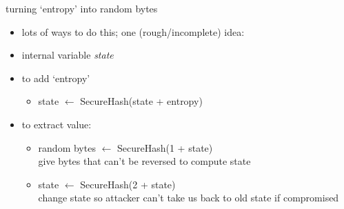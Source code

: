 \begin{frame}{turning `entropy' into random bytes}
    \begin{itemize}
    \item lots of ways to do this; one (rough/incomplete) idea:
    \item internal variable \textit{state}
    \item to add `entropy'
        \begin{itemize}
        \item state $\leftarrow$ SecureHash(state + entropy)
        \end{itemize}
    \item to extract value:
        \begin{itemize}
        \item random bytes $\leftarrow$ SecureHash(1 + state) \\
            \small give bytes that can't be reversed to compute state
                \vspace{.5cm}
        \item state $\leftarrow$ SecureHash(2 + state) \\
            \small change state so attacker can't take us back to old state if compromised
        \end{itemize}
    \end{itemize}
\end{frame}
